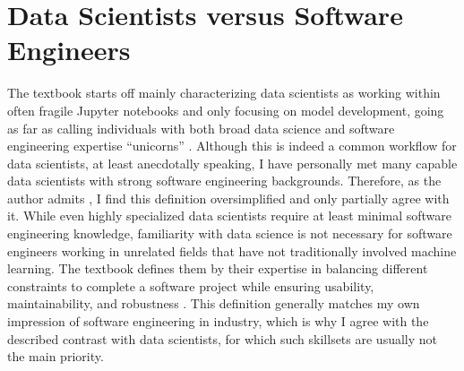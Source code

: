 \documentclass[11pt]{article}
\begin{document}
\section{Data Scientists versus Software Engineers}

The textbook starts off mainly characterizing data scientists as working within often fragile Jupyter notebooks and only focusing on model development, going as far as calling individuals with both broad data science and software engineering expertise ``unicorns'' \parencite{kastner2025machine}. Although this is indeed a common workflow for data scientists, at least anecdotally speaking, I have personally met many capable data scientists with strong software engineering backgrounds. Therefore, as the author admits \parencite{kastner2025machine}, I find this definition oversimplified and only partially agree with it. While even highly specialized data scientists require at least minimal software engineering knowledge, familiarity with data science is not necessary for software engineers working in unrelated fields that have not traditionally involved machine learning. The textbook defines them by their expertise in balancing different constraints to complete a software project while ensuring usability, maintainability, and robustness \parencite{kastner2025machine}. This definition generally matches my own impression of software engineering in industry, which is why I agree with the described contrast with data scientists, for which such skillsets are usually not the main priority.
\end{document}
